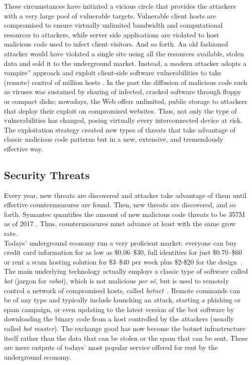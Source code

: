 \documentclass[12pt]{article}
\theoremstyle{definition}
\begin{document}
		These circumstances have initiated a vicious circle that provides the attackers with a very large pool of vulnerable targets. Vulnerable client hosts are compromised to ensure virtually unlimited bandwidth and computational resources to attackers, while server side applications are violated to host malicious code used to infect client visitors. And so forth. An old fashioned attacker would have violated a single site using all the resources available, stolen data and sold it to the underground market. Instead, a modern attacker adopts a vampire'' approach and exploit client-side software vulnerabilities to take (remote) control of million hosts \cite{Gautam2016}. In the past the diffusion of malicious code such as viruses was sustained by sharing of infected, cracked software through floppy or compact disks; nowadays, the Web offers unlimited, public storage to attackers that deploy their exploit on compromised websites.
 		 Thus, not only the type of vulnerabilities has changed, posing virtually every interconnected device at risk\cite{Iqbal2016}. The exploitation strategy created new types of threats that take advantage of classic malicious code patterns but in a new, extensive, and tremendously effective way.
		
		
		
		\subsection{Security Threats}\label{intro:threats}
		Every year, new threats are discovered and attacker take advantage of them until effective countermeasures are found. Then, new threats are discovered, and so forth. \textsf{Symantec} quantifies the amount of new malicious code threats to be 357M as of 2017 \cite{symantec_threat_report_2017}. Thus, countermeasures must advance at least with the same grow rate.\\
		
		Todays' underground economy run a very proficient market: everyone can buy credit card information for as low as \$0.06--\$30, full identities for just \$0.70--\$60 or rent a scam hosting solution for \$3--\$40 per week plus \$2-\$20 for the design~\cite{symantec_threat_report_2017}.\\ 	 

		The main underlying technology actually employs a classic type of software called \emph{bot} (jargon for \emph{robot}), which is not malicious \emph{per s\'e}, but is used to remotely control a network of compromised hosts, called \emph{botnet}~\cite{holz}. Remote commands can be of any type and typically include launching an attack, starting a phishing or spam campaign, or even updating to the latest version of the bot software by downloading the binary code from a host controlled by the attackers (usually called \emph{bot master})\cite{Airehrour2016}. The exchange good has now become the botnet infrastructure itself rather than the data that can be stolen or the spam that can be sent\cite{Ojha2017}. These are mere outputs of todays' most popular service offered for rent by the underground economy.
		
\end{document}
